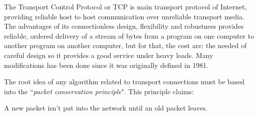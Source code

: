
The Transport Control Protocol or TCP is main transport protocol of 
Internet, providing reliable host to host communication over unreliable
transport media\cite{rfc793}. The advantages of its connectionless design,
flexibility and robustness provides reliable, ordered delivery of a stream of
bytes from a program on one computer to another program on another computer,
but for that, the cost are: the needed of careful design so it provides a good
service under heavy loads. Many modifications has been done since it was
originally defined in 1981.

The root idea of any algorithm related to transport connections must be based
into the ``\textit{packet conservation principle}". This principle claims:

\begin{defn}
A new packet isn't put into the network until an old packet leaves.
\end{defn}
